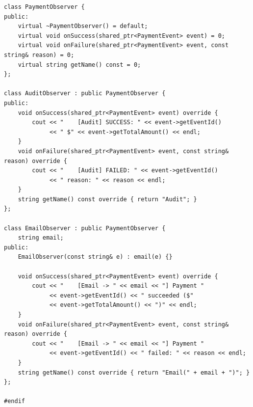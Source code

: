 \documentclass[11pt,a4paper]{article}
\begin{document}
\begin{lstlisting}[title={\texttt{strategies.hpp}}]
class PaymentObserver {
public:
    virtual ~PaymentObserver() = default;
    virtual void onSuccess(shared_ptr<PaymentEvent> event) = 0;
    virtual void onFailure(shared_ptr<PaymentEvent> event, const string& reason) = 0;
    virtual string getName() const = 0;
};

class AuditObserver : public PaymentObserver {
public:
    void onSuccess(shared_ptr<PaymentEvent> event) override {
        cout << "    [Audit] SUCCESS: " << event->getEventId()
             << " $" << event->getTotalAmount() << endl;
    }
    void onFailure(shared_ptr<PaymentEvent> event, const string& reason) override {
        cout << "    [Audit] FAILED: " << event->getEventId()
             << " reason: " << reason << endl;
    }
    string getName() const override { return "Audit"; }
};

class EmailObserver : public PaymentObserver {
    string email;
public:
    EmailObserver(const string& e) : email(e) {}

    void onSuccess(shared_ptr<PaymentEvent> event) override {
        cout << "    [Email -> " << email << "] Payment "
             << event->getEventId() << " succeeded ($"
             << event->getTotalAmount() << ")" << endl;
    }
    void onFailure(shared_ptr<PaymentEvent> event, const string& reason) override {
        cout << "    [Email -> " << email << "] Payment "
             << event->getEventId() << " failed: " << reason << endl;
    }
    string getName() const override { return "Email(" + email + ")"; }
};

#endif
\end{lstlisting}

\newpage
\end{document}
